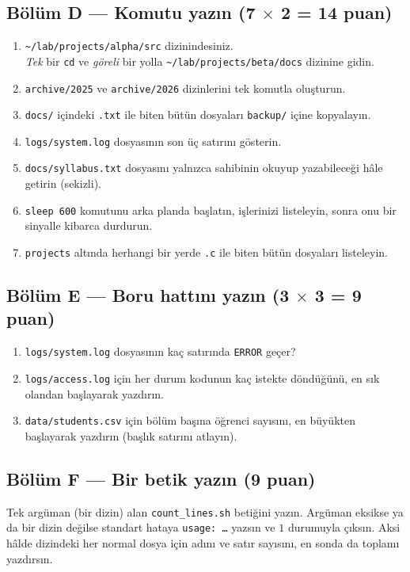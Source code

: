 \documentclass[11pt,a4paper]{article}
\newcommand{\cmd}[1]{\texttt{#1}}
\begin{document}
\subsection*{Bölüm D --- Komutu yazın (7 $\times$ 2 = 14 puan)}
\begin{enumerate}[leftmargin=1.6em,label=D\arabic*.]
  \item \texttt{\textasciitilde/lab/projects/alpha/src} dizinindesiniz.\\ \emph{Tek} bir \cmd{cd} ve \emph{göreli} bir yolla \texttt{\textasciitilde/lab/projects/beta/docs} dizinine gidin.
  \item \texttt{archive/2025} ve \texttt{archive/2026} dizinlerini tek komutla oluşturun.
  \item \texttt{docs/} içindeki \texttt{.txt} ile biten bütün dosyaları \texttt{backup/} içine kopyalayın.
  \item \texttt{logs/system.log} dosyasının son üç satırını gösterin.
  \item \texttt{docs/syllabus.txt} dosyasını yalnızca sahibinin okuyup yazabileceği hâle getirin (sekizli).
  \item \texttt{sleep 600} komutunu arka planda başlatın, işlerinizi listeleyin, sonra onu bir sinyalle kibarca durdurun.
  \item \texttt{projects} altında herhangi bir yerde \texttt{.c} ile biten bütün dosyaları listeleyin.
\end{enumerate}

\subsection*{Bölüm E --- Boru hattını yazın (3 $\times$ 3 = 9 puan)}
\begin{enumerate}[leftmargin=1.6em,label=E\arabic*.]
  \item \texttt{logs/system.log} dosyasının kaç satırında \texttt{ERROR} geçer?
  \item \texttt{logs/access.log} için her durum kodunun kaç istekte döndüğünü, en sık olandan başlayarak yazdırın.
  \item \texttt{data/students.csv} için bölüm başına öğrenci sayısını, en büyükten başlayarak yazdırın (başlık satırını atlayın).
\end{enumerate}

\subsection*{Bölüm F --- Bir betik yazın (9 puan)}
Tek argüman (bir dizin) alan \texttt{count\_lines.sh} betiğini yazın. Argüman eksikse ya da bir dizin değilse standart hataya \texttt{usage: \dots} yazsın ve $1$ durumuyla çıksın. Aksi hâlde dizindeki her normal dosya için adını ve satır sayısını, en sonda da toplamı yazdırsın.
\end{document}
